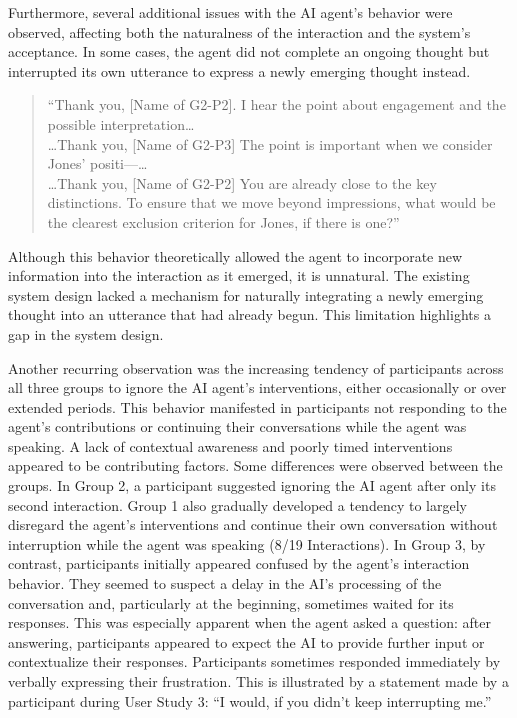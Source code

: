 Furthermore, several additional issues with the AI agent's behavior were observed, affecting both the
naturalness of the interaction and the system's acceptance. In some cases, the agent did not complete an
ongoing thought but interrupted its own utterance to express a newly emerging thought instead.
{\setlength{\topsep}{0.25\baselineskip}\setlength{\partopsep}{0pt}%
  \begin{quote}\small
    \enquote{Thank you, [Name of G2-P2]. I hear the point about engagement and the possible interpretation\ldots\\
      \ldots Thank you, [Name of G2-P3] The point is important when we consider Jones' positi—\ldots\\
      \ldots Thank you, [Name of G2-P2] You are already close to the key distinctions. To ensure that we
      move beyond impressions, what would be the clearest exclusion criterion for Jones, if
    there is one?}
\end{quote}}

Although this behavior theoretically allowed the agent to incorporate new information into the interaction as
it emerged, it is unnatural. The existing system design lacked a mechanism for naturally
integrating a newly emerging thought into an utterance that had already begun. This limitation highlights a
gap in the system design.

Another recurring observation was the increasing tendency of participants across all three groups to ignore
the AI agent's interventions, either occasionally or over extended periods. This behavior manifested in
participants not responding to the agent's contributions or continuing their conversations while the agent
was speaking. A lack of contextual awareness and poorly timed interventions appeared to be contributing
factors. Some differences were observed between the groups. In Group 2, a participant suggested ignoring the
AI agent after only its second interaction. Group 1 also gradually developed a tendency to largely disregard
the agent's interventions and continue their own conversation without interruption while the agent was
speaking (8/19 Interactions). In Group 3, by contrast, participants initially appeared confused by the
agent's interaction behavior. They seemed to suspect a delay in the AI's processing of the conversation and,
particularly at the beginning, sometimes waited for its responses. This was especially apparent when the
agent asked a question: after answering, participants appeared to expect the AI to provide further input or
contextualize their responses. Participants sometimes responded immediately by verbally expressing their
frustration. This is illustrated by a statement made by a participant during User Study 3:
“I would, if you didn't keep interrupting me.”


